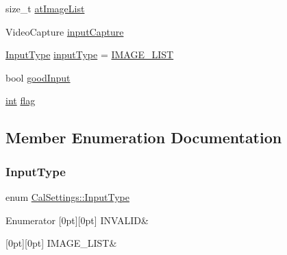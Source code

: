 \begin{DoxyCompactItemize}
\item 
size\+\_\+t \mbox{\hyperlink{class_cal_settings_adfcbf4c58e69a9d6dadae2068cb79341}{at\+Image\+List}}
\item 
Video\+Capture \mbox{\hyperlink{class_cal_settings_a43c759c4226fc06b1cb823e1d93e61c7}{input\+Capture}}
\item 
\mbox{\hyperlink{class_cal_settings_aeec3099e1fed6e349e9e006004bc3d58}{Input\+Type}} \mbox{\hyperlink{class_cal_settings_a8ca51064aed3517fc742fd81c81b8315}{input\+Type}} = \mbox{\hyperlink{class_cal_settings_aeec3099e1fed6e349e9e006004bc3d58a42620be27f3baf3945f97c4a0451b56a}{I\+M\+A\+G\+E\+\_\+\+L\+I\+ST}}
\item 
bool \mbox{\hyperlink{class_cal_settings_a0ee37fdc0b7a0589f5f1c990bfd0eceb}{good\+Input}}
\item 
\mbox{\hyperlink{draw_8hh_aa620a13339ac3a1177c86edc549fda9b}{int}} \mbox{\hyperlink{class_cal_settings_a59cd0b6f52c18498cb3f1ad5ac030338}{flag}}
\end{DoxyCompactItemize}


\subsection{Member Enumeration Documentation}
\mbox{\label{class_cal_settings_aeec3099e1fed6e349e9e006004bc3d58}} 
\subsubsection{\texorpdfstring{InputType}{InputType}}
{\footnotesize\ttfamily enum \mbox{\hyperlink{class_cal_settings_aeec3099e1fed6e349e9e006004bc3d58}{Cal\+Settings\+::\+Input\+Type}}}

\begin{DoxyEnumFields}{Enumerator}
[0pt][0pt]{}\mbox{\label{class_cal_settings_aeec3099e1fed6e349e9e006004bc3d58ac7f02a9057bd231c457feb514f4ecff6}} 
I\+N\+V\+A\+L\+ID&\\
\hline

[0pt][0pt]{}\mbox{\label{class_cal_settings_aeec3099e1fed6e349e9e006004bc3d58a42620be27f3baf3945f97c4a0451b56a}} 
I\+M\+A\+G\+E\+\_\+\+L\+I\+ST&\\
\hline

\end{DoxyEnumFields}
\mbox{\label{class_cal_settings_a0a24f2a2a233efe9213f28e527314500}} 
